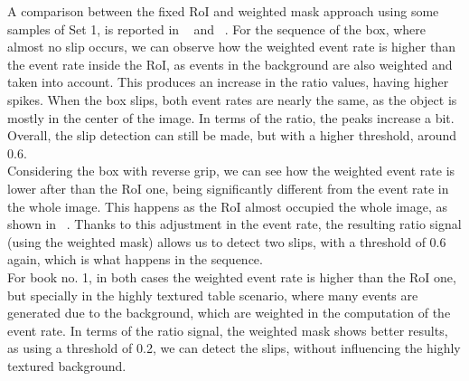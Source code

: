 A comparison between the fixed RoI and weighted mask approach using some samples of Set 1, is reported in ~ and ~. For the sequence of the box, where almost no slip occurs, we can observe how the weighted event rate is higher than the event rate inside the RoI, as events in the background are also weighted and taken into account. This produces an increase in the ratio values, having higher spikes. When the box slips, both event rates are nearly the same, as the object is mostly in the center of the image. In terms of the ratio, the peaks increase a bit. Overall, the slip detection can still be made, but with a higher threshold, around 0.6.\\

Considering the box with reverse grip, we can see how the weighted event rate is lower after than the RoI one, being significantly different from the event rate in the whole image. This happens as the RoI almost occupied the whole image, as shown in ~. Thanks to this adjustment in the event rate, the resulting ratio signal (using the weighted mask) allows us to detect two slips, with a threshold of 0.6 again, which is what happens in the sequence.\\

For book no. 1, in both cases the weighted event rate is higher than the RoI one, but specially in the highly textured table scenario, where many events are generated due to the background, which are weighted in the computation of the event rate. In terms of the ratio signal, the weighted mask shows better results, as using a threshold of 0.2, we can detect the slips, without influencing the highly textured background.

